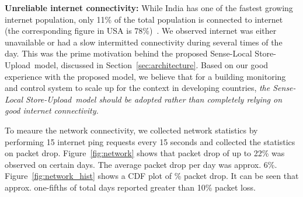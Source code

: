 \documentclass[10pt]{sensys-proc}
\newcommand{\figref}[1]{Figure~\ref{#1}}
\newcommand{\secref}[1]{Section~\ref{#1}}
\newcommand{\paradigms}{Sense-Local Store-Upload~}
\begin{document}
\noindent \textbf{Unreliable internet connectivity:} While India has one of the fastest growing internet population, only 11\% of the total population is connected to internet (the corresponding figure in USA is 78\%)~\cite{meyer}. %
We observed internet was either unavailable or had a slow intermitted connectivity during several times of the day. This was the prime motivation behind the proposed \paradigms model, discussed in \secref{sec:architecture}. Based on our good experience with the proposed model, we believe that for a building monitoring and control system to scale up for the context in developing countries, \emph{the \paradigms model should be adopted rather than completely relying on good internet connectivity.} %

\noindent To meaure the network connectivity, we collected network statistics by performing 15 internet ping requests every 15 seconds and collected the statistics on packet drop. \figref{fig:network} shows that packet drop of up to 22\% was observed on certain days. The average packet drop per day was approx. 6\%. \figref{fig:network_hist} shows a CDF plot of \% packet drop. It can be seen that approx. one-fifths of total days reported greater than 10\% packet loss. 
\end{document}
